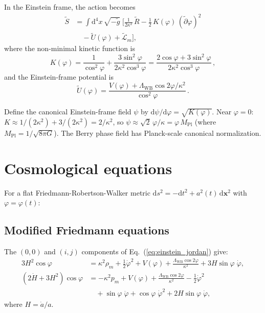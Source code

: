\documentclass[aps,prd,twocolumn,superscriptaddress,nofootinbib]{revtex4-2}
\newcommand{\dd}{\mathrm{d}}
\newcommand{\Mpl}{M_{\mathrm{Pl}}}
\newcommand{\Lw}{\Lambda_{\mathrm{WB}}}
\begin{document}
In the Einstein frame, the action becomes
\begin{align}
  \tilde{S} &= \int \dd^4 x\,\sqrt{-\tilde{g}}\;
  \biggl[\frac{1}{2\kappa^2}\,\tilde{R}
  - \frac{1}{2}\,K(\varphi)\,(\tilde\partial\varphi)^2
  \nonumber \\
  &\quad - \tilde{U}(\varphi)
  + \tilde{\mathcal{L}}_m
  \biggr],
  \label{eq:action_einstein}
\end{align}
where the non-minimal kinetic function is
\begin{equation}
  K(\varphi) = \frac{1}{\cos^2\varphi}
  + \frac{3\sin^2\varphi}{2\kappa^2\cos^3\varphi}
  = \frac{2\cos\varphi + 3\sin^2\varphi}{2\kappa^2\cos^3\varphi}\,,
  \label{eq:K_phi}
\end{equation}
and the Einstein-frame potential is
\begin{equation}
  \tilde{U}(\varphi)
  = \frac{V(\varphi) + \Lw\cos 2\varphi/\kappa^2}{\cos^2\varphi}\,.
  \label{eq:U_einstein}
\end{equation}

Define the canonical Einstein-frame field $\psi$ by
$\dd\psi/\dd\varphi = \sqrt{K(\varphi)}$.
Near $\varphi = 0$: $K \approx 1/(2\kappa^2) + 3/(2\kappa^2) = 2/\kappa^2$,
so $\psi \approx \sqrt{2}\,\varphi/\kappa = \varphi\,\Mpl$
(where $\Mpl = 1/\sqrt{8\pi G}$).
The Berry phase field has Planck-scale canonical normalization.


\section{Cosmological equations}
\label{sec:cosmology}

For a flat Friedmann-Robertson-Walker metric
$\dd s^2 = -\dd t^2 + a^2(t)\,\dd\mathbf{x}^2$
with $\varphi = \varphi(t)$:

\subsection{Modified Friedmann equations}

The $(0,0)$ and $(i,j)$ components of Eq.~(\ref{eq:einstein_jordan})
give:
\begin{align}
  3H^2\cos\varphi
  &= \kappa^2\rho_m + \frac{1}{2}\dot\varphi^2 + V(\varphi)
  + \frac{\Lw\cos 2\varphi}{\kappa^2} + 3H\sin\varphi\;\dot\varphi,
  \label{eq:friedmann1}
  \\
  (2\dot{H} + 3H^2)\cos\varphi
  &= -\kappa^2 p_m + V(\varphi)
  + \frac{\Lw\cos 2\varphi}{\kappa^2}
  - \frac{1}{2}\dot\varphi^2
  \nonumber \\
  &\quad + \sin\varphi\;\ddot\varphi
  + \cos\varphi\;\dot\varphi^2
  + 2H\sin\varphi\;\dot\varphi,
  \label{eq:friedmann2}
\end{align}
where $H = \dot{a}/a$.
\end{document}
